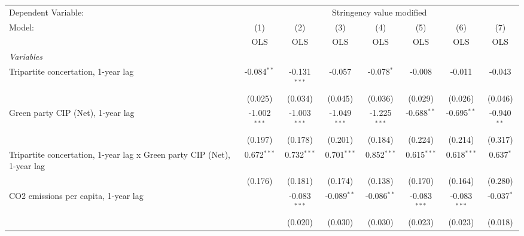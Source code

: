 
\begingroup
\centering
\begin{tabular}{lccccccc}
   \toprule
   Dependent Variable: & \multicolumn{7}{c}{Stringency value modified}\\
   Model:                                                                  & (1)            & (2)            & (3)            & (4)            & (5)            & (6)            & (7)\\  
                                                                           &  OLS           & OLS            & OLS            & OLS            & OLS            & OLS            & OLS\\  
   \midrule
   \emph{Variables}\\
   Tripartite concertation, 1-year lag                                     & -0.084$^{**}$  & -0.131$^{***}$ & -0.057         & -0.078$^{*}$   & -0.008         & -0.011         & -0.043\\   
                                                                           & (0.025)        & (0.034)        & (0.045)        & (0.036)        & (0.029)        & (0.026)        & (0.046)\\   
   Green party CIP (Net), 1-year lag                                       & -1.002$^{***}$ & -1.003$^{***}$ & -1.049$^{***}$ & -1.225$^{***}$ & -0.688$^{**}$  & -0.695$^{**}$  & -0.940$^{**}$\\   
                                                                           & (0.197)        & (0.178)        & (0.201)        & (0.184)        & (0.224)        & (0.214)        & (0.317)\\   
   Tripartite concertation, 1-year lag x Green party CIP (Net), 1-year lag & 0.672$^{***}$  & 0.732$^{***}$  & 0.701$^{***}$  & 0.852$^{***}$  & 0.615$^{***}$  & 0.618$^{***}$  & 0.637$^{*}$\\   
                                                                           & (0.176)        & (0.181)        & (0.174)        & (0.138)        & (0.170)        & (0.164)        & (0.280)\\   
   CO2 emissions per capita, 1-year lag                                    &                & -0.083$^{***}$ & -0.089$^{**}$  & -0.086$^{**}$  & -0.083$^{***}$ & -0.083$^{***}$ & -0.037$^{*}$\\   
                                                                           &                & (0.020)        & (0.030)        & (0.030)        & (0.023)        & (0.023)        & (0.018)\\   

\end{tabular}
